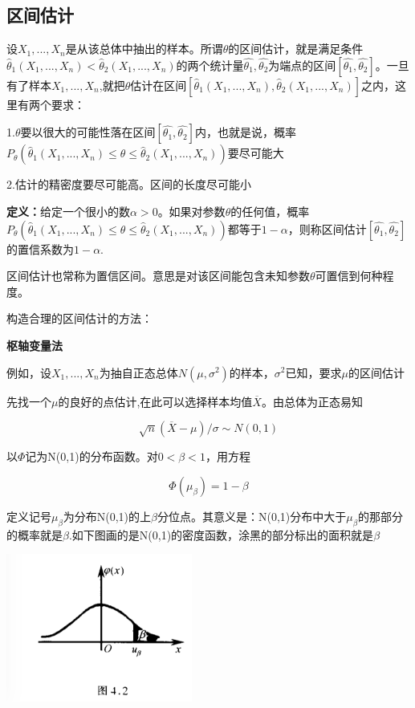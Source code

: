 \documentclass{ctexart}
\begin{document}
	\subsection{区间估计}
	
	设\(X_1,...,X_n\)是从该总体中抽出的样本。所谓\(\theta\)的区间估计，就是满足条件\(\hat{\theta}_1(X_1,...,X_n) < \hat{\theta}_2(X_1,...,X_n)\)的两个统计量\(\hat{\theta_1},\hat{\theta_2}\)为端点的区间\([\hat{\theta_1},\hat{\theta_2}]\)。一旦有了样本\(X_1,...,X_n\),就把\(\theta\)估计在区间\([\hat{\theta}_1(X_1,...,X_n) , \hat{\theta}_2(X_1,...,X_n)]\)之内，这里有两个要求：
	
	1.\(\theta\)要以很大的可能性落在区间\([\hat{\theta_1},\hat{\theta_2}]\)内，也就是说，概率\(P_\theta(\hat{\theta}_1(X_1,...,X_n) \leq \theta \leq \hat{\theta}_2(X_1,...,X_n))\)要尽可能大
	
	2.估计的精密度要尽可能高。区间的长度尽可能小
	
	\textbf{定义：}给定一个很小的数\(\alpha > 0\)。如果对参数\(\theta\)的任何值，概率\(P_\theta(\hat{\theta}_1(X_1,...,X_n) \leq \theta \leq \hat{\theta}_2(X_1,...,X_n))\)都等于\(1-\alpha\)，则称区间估计\([\hat{\theta_1},\hat{\theta_2}]\)的置信系数为\(1-\alpha\).
	
	区间估计也常称为置信区间。意思是对该区间能包含未知参数\(\theta\)可置信到何种程度。
	
	构造合理的区间估计的方法：
	
	\textbf{枢轴变量法}
	
	例如，设\(X_1,...,X_n\)为抽自正态总体\(N(\mu, \sigma^2)\)的样本，{\color{red}\(\sigma^2\)}已知，要求\(\mu\)的区间估计
	
	{\color{red}先找一个\(\mu\)的良好的点估计},在此可以选择样本均值\(\overline{X}\)。由总体为正态易知
	
	\[\sqrt{n}(\overline{X}-\mu)/\sigma \sim N(0, 1)\]
	
	以\(\varPhi\)记为N(0,1)的分布函数。对\(0 < \beta < 1\)，用方程
	
	\[\varPhi(\mu_\beta)=1-\beta\]
	
	定义记号\(\mu_\beta\)为分布N(0,1)的上\(\beta\)分位点。其意义是：N(0,1)分布中大于\(\mu_\beta\)的那部分的概率就是\(\beta\).如下图画的是N(0,1)的密度函数，涂黑的部分标出的面积就是\(\beta\)
	
	\includegraphics[width=0.8\linewidth]{pic/beta}
	
\end{document}
